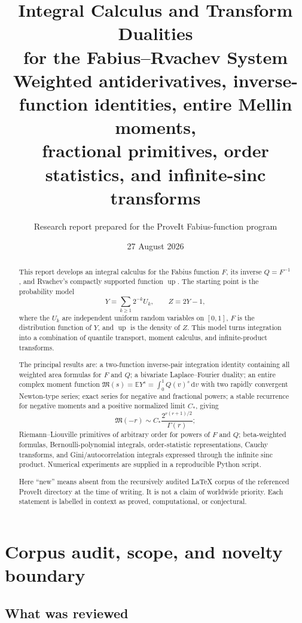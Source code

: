\documentclass[11pt,oneside]{article}
\title{\bfseries Integral Calculus and Transform Dualities\\[2mm]
for the Fabius--Rvachev System\\[1mm]
\large Weighted antiderivatives, inverse-function identities, entire Mellin moments,\\
fractional primitives, order statistics, and infinite-sinc transforms}
\author{Research report prepared for the ProveIt Fabius-function program}
\date{27 August 2026}
\theoremstyle{definition}
\newcommand{\F}{F}
\newcommand{\Q}{Q}
\newcommand{\upf}{\operatorname{up}}
\newcommand{\M}{\mathfrak M}
\newcommand{\E}{\mathbb E}
\newcommand{\dd}{\,\mathrm d}
\begin{document}
\maketitle

\begin{abstract}
This report develops an integral calculus for the Fabius function \(\F\), its inverse
\(\Q=\F^{-1}\), and Rvachev's compactly supported function \(\upf\).  The starting
point is the probability model
\[
  Y=\sum_{k\ge1}2^{-k}U_k,\qquad Z=2Y-1,
\]
where the \(U_k\) are independent uniform random variables on \([0,1]\), \(\F\) is
the distribution function of \(Y\), and \(\upf\) is the density of \(Z\).  This model
turns integration into a combination of quantile transport, moment calculus, and
infinite-product transforms.

The principal results are: a two-function inverse-pair integration identity containing
all weighted area formulas for \(\F\) and \(\Q\); a bivariate Laplace--Fourier duality;
an entire complex moment function \(\M(s)=\E Y^s=\int_0^1\Q(v)^s\dd v\) with two
rapidly convergent Newton-type series; exact series for negative and fractional powers;
a stable recurrence for negative moments and a positive normalized limit
\(C_*\), giving
\[
  \M(-r)\sim C_*\frac{2^{r(r+1)/2}}{\Gamma(r)};
\]
Riemann--Liouville primitives of arbitrary order for powers of \(\F\) and \(\Q\);
beta-weighted formulas, Bernoulli-polynomial integrals, order-statistic representations,
Cauchy transforms, and Gini/autocorrelation integrals expressed through the infinite
sinc product.  Numerical experiments are supplied in a reproducible Python script.

Here ``new'' means absent from the recursively audited LaTeX corpus of the referenced
ProveIt directory at the time of writing.  It is not a claim of worldwide priority.
Each statement is labelled in context as proved, computational, or conjectural.
\end{abstract}

\tableofcontents
\bigskip

\section{Corpus audit, scope, and novelty boundary}

\subsection{What was reviewed}
\end{document}
